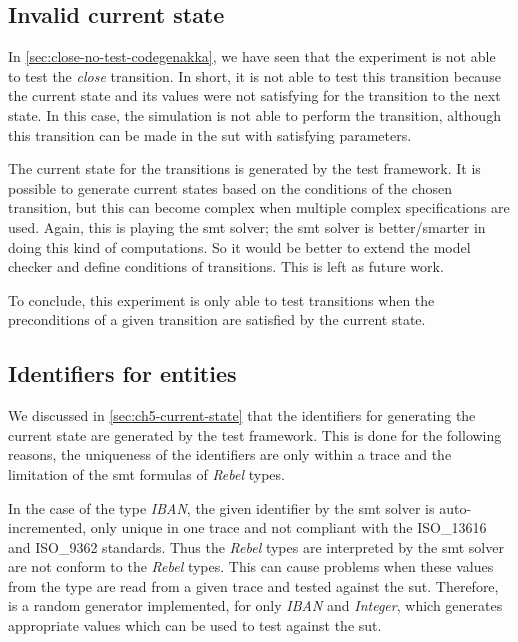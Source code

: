 \subsection{Invalid current state}
In \autoref{sec:close-no-test-codegenakka}, we have seen that the experiment is
not able to test the \textit{close} transition. In short, it is not able to test
this transition because the current state and its values were not satisfying for
the transition to the next state. In this case, the simulation is not able to
perform the transition, although this transition can be made in the \gls{sut}
with satisfying parameters.

The current state for the transitions is generated by the test framework. It is
possible to generate current states based on the conditions of the chosen
transition, but this can become complex when multiple complex specifications are
used. Again, this is playing the \gls{smt} solver; the \gls{smt} solver is
better/smarter in doing this kind of computations. So it would be better to
extend the model checker and define conditions of transitions. This is left as
future work.

To conclude, this experiment is only able to test transitions when the
preconditions of a given transition are satisfied by the current state.


\subsection{Identifiers for entities}
We discussed in \autoref{sec:ch5-current-state} that the identifiers for
generating the current state are generated by the test framework. This is done
for the following reasons, the uniqueness of the identifiers are only within a
trace and the limitation of the \gls{smt} formulas of \textit{Rebel} types.

In the case of the type \textit{IBAN}, the given identifier by the \gls{smt}
solver is auto-incremented, only unique in one trace and not compliant with the
ISO\_13616 and ISO\_9362 standards. Thus the \textit{Rebel} types are
interpreted by the \gls{smt} solver are not conform to the \textit{Rebel} types.
This can cause problems when these values from the type are read from a given
trace and tested against the \gls{sut}. Therefore, is a random generator
implemented, for only \textit{IBAN} and \textit{Integer}, which generates
appropriate values which can be used to test against the \gls{sut}.

